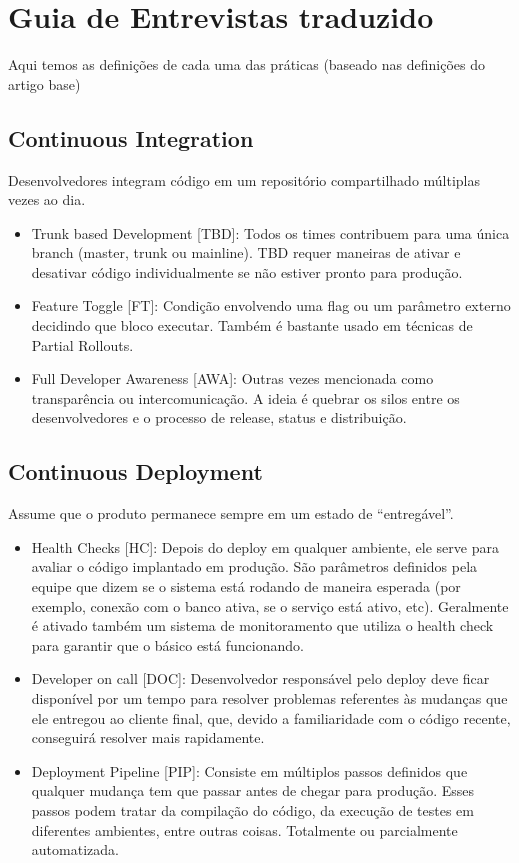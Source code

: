 \chapter{Guia de Entrevistas traduzido}

Aqui temos as definições de cada uma das práticas (baseado nas definições do artigo base)

\section{Continuous Integration}

Desenvolvedores integram código em um repositório compartilhado múltiplas vezes ao dia.
\begin{itemize}
    \item  Trunk based Development [TBD]: Todos os times contribuem para uma única branch (master, trunk ou mainline). TBD requer maneiras de ativar e desativar código individualmente se não estiver pronto para produção.
    \item  Feature Toggle [FT]: Condição envolvendo uma flag ou um parâmetro externo decidindo que bloco executar. Também é bastante usado em técnicas de Partial Rollouts.
    \item  Full Developer Awareness [AWA]: Outras vezes mencionada como transparência ou intercomunicação. A ideia é quebrar os silos entre os desenvolvedores e o processo de release, status e distribuição.
\end{itemize}

\section{Continuous Deployment}
Assume que o produto permanece sempre em um estado de “entregável”.
\begin{itemize}
    \item Health Checks [HC]: Depois do deploy em qualquer ambiente, ele serve para avaliar o código implantado em produção. São parâmetros definidos pela equipe que dizem se o sistema está rodando de maneira esperada (por exemplo, conexão com o banco ativa, se o serviço está ativo, etc). Geralmente é ativado também um sistema de monitoramento que utiliza o health check para garantir que o básico está funcionando.
    \item Developer on call [DOC]: Desenvolvedor responsável pelo deploy deve ficar disponível por um tempo para resolver problemas referentes às mudanças que ele entregou ao cliente final, que, devido a familiaridade com o código recente, conseguirá resolver mais rapidamente.
    \item Deployment Pipeline [PIP]: Consiste em múltiplos passos definidos que qualquer mudança tem que passar antes de chegar para produção. Esses passos podem tratar da compilação do código, da execução de testes em diferentes ambientes, entre outras coisas. Totalmente ou parcialmente automatizada.
\end{itemize}



